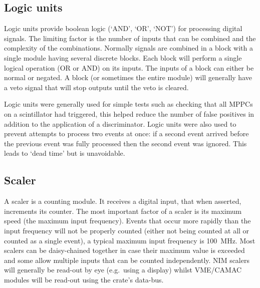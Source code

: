 
\subsection{Logic units} %
\label{ssub:logic_units}
Logic units provide boolean logic (`AND', `OR', `NOT') for processing digital signals. The limiting factor is the number of inputs that can be combined and the complexity of the combinations. Normally signals are combined in a block with a single module having several discrete blocks. Each block will perform a single logical operation (OR or AND) on its inputs. The inputs of a block can either be normal or negated. A block (or sometimes the entire module) will generally have a veto signal that will stop outputs until the veto is cleared.

Logic units were generally used for simple tests such as checking that all MPPCs on a scintillator had triggered, this helped reduce the number of false positives in addition to the application of a discriminator. Logic units were also used to prevent attempts to process two events at once: if a second event arrived before the previous event was fully processed then the second event was ignored. This leads to `dead time' but is unavoidable.

\subsection{Scaler} %
\label{ssub:scaler}
A scaler is a counting module. It receives a digital input, that when asserted, increments its counter. The most important factor of a scaler is its maximum speed (the maximum input frequency). Events that occur more rapidly than the input frequency will not be properly counted (either not being counted at all or counted as a single event), a typical maximum input frequency is 100~MHz. Most scalers can be daisy-chained together in case their maximum value is exceeded and some allow multiple inputs that can be counted independently. NIM scalers will generally be read-out by eye (e.g.\ using a display) whilst VME/CAMAC modules will be read-out using the crate's data-bus. 

